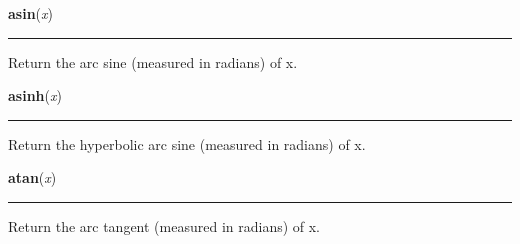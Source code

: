     \label{math:asin}

    \vspace{0.5ex}

\hspace{.8\funcindent}\begin{boxedminipage}{\funcwidth}

    \raggedright \textbf{asin}(\textit{x})

    \vspace{-1.5ex}

    \rule{\textwidth}{0.5\fboxrule}
\setlength{\parskip}{2ex}
    Return the arc sine (measured in radians) of x.

\setlength{\parskip}{1ex}
    \end{boxedminipage}

    \label{math:asinh}

    \vspace{0.5ex}

\hspace{.8\funcindent}\begin{boxedminipage}{\funcwidth}

    \raggedright \textbf{asinh}(\textit{x})

    \vspace{-1.5ex}

    \rule{\textwidth}{0.5\fboxrule}
\setlength{\parskip}{2ex}
    Return the hyperbolic arc sine (measured in radians) of x.

\setlength{\parskip}{1ex}
    \end{boxedminipage}

    \label{math:atan}

    \vspace{0.5ex}

\hspace{.8\funcindent}\begin{boxedminipage}{\funcwidth}

    \raggedright \textbf{atan}(\textit{x})

    \vspace{-1.5ex}

    \rule{\textwidth}{0.5\fboxrule}
\setlength{\parskip}{2ex}
    Return the arc tangent (measured in radians) of x.

\setlength{\parskip}{1ex}
    \end{boxedminipage}

    \label{math:atan2}


